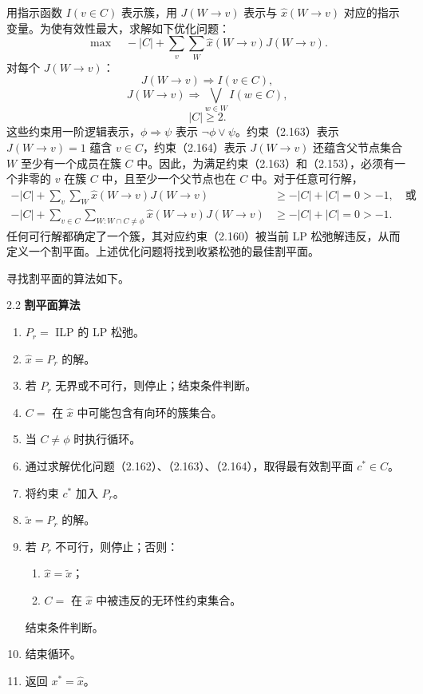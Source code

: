用指示函数 $I(v\in C)$ 表示簇，用 $J(W\to v)$ 表示与 $\widehat x(W\to v)$ 对应的指示变量。为使有效性最大，求解如下优化问题：
\begin{equation}
\max\quad -|C|+\sum_v\sum_W\widehat x(W\to v)J(W\to v).
\tag{2.162}
\end{equation}
对每个 $J(W\to v)$：
\begin{equation}
J(W\to v)\Rightarrow I(v\in C),
\tag{2.163}
\end{equation}
\begin{equation}
J(W\to v)\Rightarrow\bigvee_{w\in W}I(w\in C),
\tag{2.164}
\end{equation}
\[
|C|\geq2.
\]
这些约束用一阶逻辑表示，$\phi\Rightarrow\psi$ 表示 $\neg\phi\vee\psi$。约束（2.163）表示 $J(W\to v)=1$ 蕴含 $v\in C$，约束（2.164）表示 $J(W\to v)$ 还蕴含父节点集合 $W$ 至少有一个成员在簇 $C$ 中。因此，为满足约束（2.163）和（2.153），必须有一个非零的 $v$ 在簇 $C$ 中，且至少一个父节点也在 $C$ 中。对于任意可行解，
\begin{equation}
\begin{aligned}
-|C|+\sum_v\sum_W\widehat x(W\to v)J(W\to v)
&\geq-|C|+|C|=0>-1,\quad\text{或}\\
-|C|+\sum_{v\in C}\sum_{W:W\cap C\ne\phi}\widehat x(W\to v)J(W\to v)
&\geq-|C|+|C|=0>-1.
\end{aligned}\tag{2.165}
\end{equation}
任何可行解都确定了一个簇，其对应约束（2.160）被当前 LP 松弛解违反，从而定义一个割平面。上述优化问题将找到收紧松弛的最佳割平面。

寻找割平面的算法如下。
\begin{bookalgorithm}{2.2}
\textbf{割平面算法}
\begin{enumerate}
\item $P_r=$ ILP 的 LP 松弛。
\item $\widehat x=P_r$ 的解。
\item 若 $P_r$ 无界或不可行，则停止；结束条件判断。
\item $C=$ 在 $\widehat x$ 中可能包含有向环的簇集合。
\item 当 $C\ne\phi$ 时执行循环。
\item 通过求解优化问题（2.162）、（2.163）、（2.164），取得最有效割平面 $c^*\in C$。
\item 将约束 $c^*$ 加入 $P_r$。
\item $\widetilde x=P_r$ 的解。
\item 若 $P_r$ 不可行，则停止；否则：
\begin{enumerate}[label=(\alph*)]
\item $\widehat x=\widetilde x$；
\item $C=$ 在 $\widehat x$ 中被违反的无环性约束集合。
\end{enumerate}
结束条件判断。
\item 结束循环。
\item 返回 $x^*=\widehat x$。
\end{enumerate}
\end{bookalgorithm}

